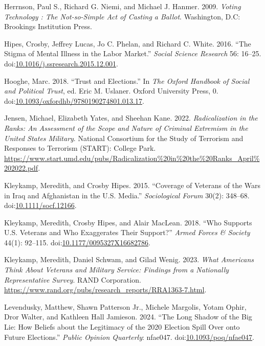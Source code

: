\documentclass[
  11pt,
  a4paper,
]{scrartcl}
\newlength{\cslhangindent}
\newenvironment{CSLReferences}[2] %
 {\begin{list}{}{%
  \setlength{\itemindent}{0pt}
  \setlength{\leftmargin}{0pt}
  \setlength{\parsep}{0pt}
  \ifodd #1
   \setlength{\leftmargin}{\cslhangindent}
   \setlength{\itemindent}{-1\cslhangindent}
  \fi
  \setlength{\itemsep}{#2\baselineskip}}}
 {\end{list}}
\begin{document}
\begin{CSLReferences}{1}{1}
Herrnson, Paul S., Richard G. Niemi, and Michael J. Hanmer. 2009.
\emph{Voting Technology : The Not-so-Simple Act of Casting a Ballot}.
Washington, D.C: Brookings Institution Press.

Hipes, Crosby, Jeffrey Lucas, Jo C. Phelan, and Richard C. White. 2016.
{``The Stigma of Mental Illness in the Labor Market.''} \emph{Social
Science Research} 56: 16--25.
doi:\href{https://doi.org/10.1016/j.ssresearch.2015.12.001}{10.1016/j.ssresearch.2015.12.001}.

Hooghe, Marc. 2018. {``Trust and {Elections}.''} In \emph{The {Oxford
Handbook} of {Social} and {Political Trust}}, ed. Eric M. Uslaner.
Oxford University Press, 0.
doi:\href{https://doi.org/10.1093/oxfordhb/9780190274801.013.17}{10.1093/oxfordhb/9780190274801.013.17}.

Jensen, Michael, Elizabeth Yates, and Sheehan Kane. 2022.
\emph{Radicalization in the {Ranks}: {An Assessment} of the {Scope} and
{Nature} of {Criminal Extremism} in the {United States Military}}.
{National Consortium for the Study of Terrorism and Responses to
Terrorism (START): College Park}.
\url{https://www.start.umd.edu/pubs/Radicalization\%20in\%20the\%20Ranks_April\%202022.pdf}.

Kleykamp, Meredith, and Crosby Hipes. 2015. {``Coverage of {Veterans} of
the {Wars} in {Iraq} and {Afghanistan} in the {U}.{S}. {Media}.''}
\emph{Sociological Forum} 30(2): 348--68.
doi:\href{https://doi.org/10.1111/socf.12166}{10.1111/socf.12166}.

Kleykamp, Meredith, Crosby Hipes, and Alair MacLean. 2018. {``Who
{Supports U}.{S}. {Veterans} and {Who Exaggerates Their Support}?''}
\emph{Armed Forces \& Society} 44(1): 92--115.
doi:\href{https://doi.org/10.1177/0095327X16682786}{10.1177/0095327X16682786}.

Kleykamp, Meredith, Daniel Schwam, and Gilad Wenig. 2023. \emph{What
{Americans Think About Veterans} and {Military Service}: {Findings} from
a {Nationally Representative Survey}}. RAND Corporation.
\url{https://www.rand.org/pubs/research_reports/RRA1363-7.html}.

Levendusky, Matthew, Shawn Patterson Jr., Michele Margolis, Yotam Ophir,
Dror Walter, and Kathleen Hall Jamieson. 2024. {``The {Long Shadow} of
the {Big Lie}: {How Beliefs} about the {Legitimacy} of the 2020
{Election Spill Over} onto {Future Elections}.''} \emph{Public Opinion
Quarterly}: nfae047.
doi:\href{https://doi.org/10.1093/poq/nfae047}{10.1093/poq/nfae047}.


\end{CSLReferences}
\end{document}
